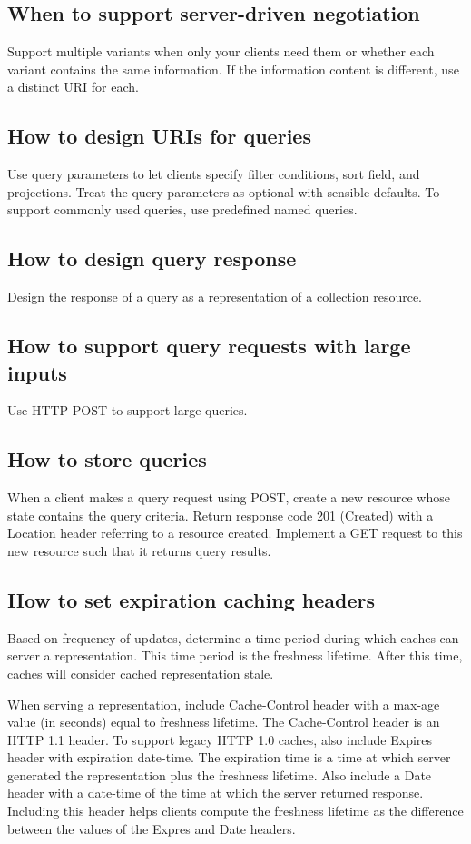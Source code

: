 \documentclass[11pt,a4paper]{article}
\begin{document}
\subsection{When to support server-driven negotiation}
Support multiple variants when only your clients need them or whether each variant contains the same information. If the information content is different, use a distinct URI for each.

\subsection{How to design URIs for queries}
Use query parameters to let clients specify filter conditions, sort field, and projections. Treat the query parameters as optional with sensible defaults. To support commonly used queries, use predefined named queries.

\subsection{How to design query response}
Design the response of a query as a representation of a collection resource.

\subsection{How to support query requests with large inputs}
Use HTTP POST to support large queries.

\subsection{How to store queries}
When a client makes a query request using POST, create a new resource whose state contains the query criteria. Return response code 201 (Created) with a Location header referring to a resource created. Implement a GET request to this new resource such that it returns query results.

\subsection{How to set expiration caching headers}
Based on frequency of updates, determine a time period during which caches can server a representation. This time period is the freshness lifetime. After this time, caches will consider cached representation stale.

When serving a representation, include Cache-Control header with a max-age value (in seconds) equal to freshness lifetime. The Cache-Control header is an HTTP 1.1 header. To support legacy HTTP 1.0 caches, also include Expires header with expiration date-time. The expiration time is a time at which server generated the representation plus the freshness lifetime. Also include a Date header with a date-time of the time at which the server returned response. Including this header helps clients compute the freshness lifetime as the difference between the values of the Expres and Date headers.
\end{document}
